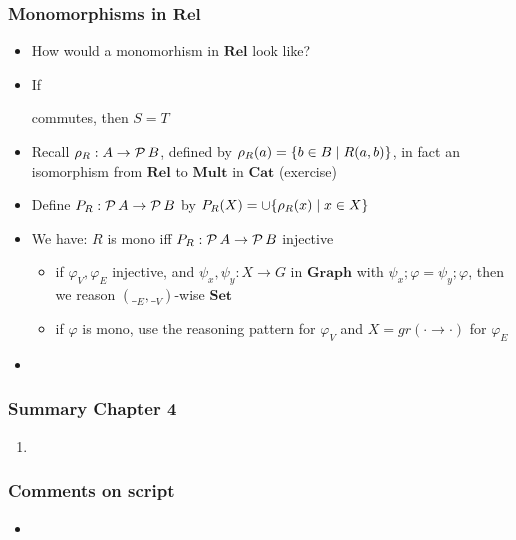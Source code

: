 \documentclass[handout]{beamer}
\newcommand{\bfsf}[1]{{\boldsymbol{#1}}}
\newcommand{\Set}{\bfsf{Set}}
\newcommand{\Gra}{\bfsf{Graph}}
\newcommand{\Rel}{\bfsf{Rel}}
\newcommand{\Mult}{\bfsf{Mult}}
\newcommand{\Cat}{\bfsf{Cat}}
\begin{document}
\frame
  {   
    \frametitle{Monomorphisms in $\Rel$}\label{Ch4:MonosRel}

 \begin{itemize}[<+->]
\item How would a monomorhism in $\Rel$ look like?
\item 
If
commutes, then $S=T$
\item Recall  $\rho_R : A\to \operatorname{\mathcal{P}}{B}$, 
defined by $\rho_R(a) = \{b\in B\mid R(a,b)\}$,
in fact an isomorphism from $\Rel$ to $\Mult$ in $\Cat$ (exercise)
\item Define $P_R : \operatorname{\mathcal{P}}{A}\to \operatorname{\mathcal{P}}{B}$ by $P_R(X) = \cup\{\rho_R(x) \mid x\in X\}$
\item We have: $R$ is mono iff  $P_R : \operatorname{\mathcal{P}}{A}\to \operatorname{\mathcal{P}}{B}$ injective
 \begin{itemize}
    \item if $\varphi_V,\varphi_E$ injective, and $\psi_x,\psi_y: X\to G$ in $\Gra$
with $\psi_x;\varphi = \psi_y;\varphi$, then we reason $(\__E,\__V)$-wise $\Set$
    \item if $\varphi$ is mono, use the reasoning pattern
for $\varphi_V$ and $X=gr({\cdot}{\to}{\cdot})$ for $\varphi_E$
\end{itemize}
\item 
 \end{itemize}

 }


\frame
  {   
    \frametitle{Summary Chapter 4}\label{Ch4:Summary}

 \begin{enumerate}[<+->]
\item 
 \end{enumerate}


}

\frame
  {   
    \frametitle{Comments on script}\label{Ch4:comments}

 \begin{itemize}[<+->]
\item 
 \end{itemize}

 }
\end{document}
